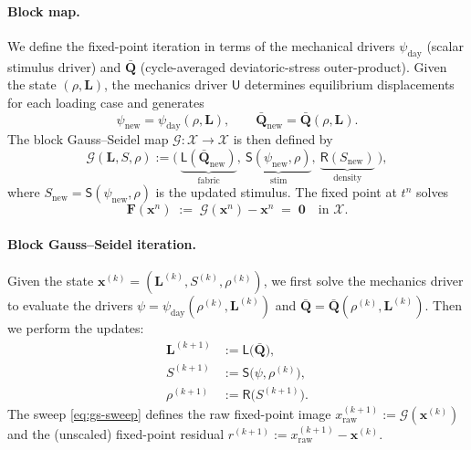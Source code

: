 \paragraph{Block map.}
We define the fixed-point iteration in terms of the mechanical drivers $\psi_{\mathrm{day}}$ (scalar stimulus driver) and $\bar{\mathbf{Q}}$ (cycle-averaged deviatoric-stress outer-product). Given the state $(\rho, \mathbf{L})$, the mechanics driver $\mathsf{U}$ determines equilibrium displacements for each loading case and generates
\[
\psi_{\mathrm{new}} = \psi_{\mathrm{day}}(\rho,\mathbf{L}), \qquad \bar{\mathbf{Q}}_{\mathrm{new}} = \bar{\mathbf{Q}}(\rho,\mathbf{L}).
\]
The block Gauss--Seidel map $\mathcal{G}:\mathcal{X}\to\mathcal{X}$ is then defined by
\begin{equation}\label{eq:block-map}
\mathcal{G}(\mathbf{L},S,\rho)
:=
\Big(\ \underbrace{\mathsf{L}(\bar{\mathbf{Q}}_{\mathrm{new}})}_{\text{fabric}},\ \underbrace{\mathsf{S}(\psi_{\mathrm{new}},\rho)}_{\text{stim}},\ \underbrace{\mathsf{R}(S_{\mathrm{new}})}_{\text{density}}\ \Big),
\end{equation}
where $S_{\mathrm{new}}=\mathsf{S}(\psi_{\mathrm{new}},\rho)$ is the updated stimulus. 
The fixed point at $t^n$ solves
\begin{equation}\label{eq:fp-residual}
\mathbf{F}(\mathbf{x}^n)\;:=\;\mathcal{G}(\mathbf{x}^n)-\mathbf{x}^n \;=\; \mathbf{0}\quad\text{in }\mathcal{X}.
\end{equation}

\paragraph{Block Gauss--Seidel iteration.}
Given the state $\mathbf{x}^{(k)}=(\mathbf{L}^{(k)},S^{(k)},\rho^{(k)})$, we first solve the mechanics driver to evaluate the drivers $\psi=\psi_{\mathrm{day}}(\rho^{(k)},\mathbf{L}^{(k)})$ and $\bar{\mathbf{Q}}=\bar{\mathbf{Q}}(\rho^{(k)},\mathbf{L}^{(k)})$. Then we perform the updates:
\begin{equation}\label{eq:gs-sweep}
\begin{aligned}
\mathbf{L}^{(k+1)} &:= \mathsf{L}\big(\bar{\mathbf{Q}}\big),\\
S^{(k+1)} &:= \mathsf{S}\big(\psi,\rho^{(k)}\big),\\
\rho^{(k+1)} &:= \mathsf{R}\big(S^{(k+1)}\big).
\end{aligned}
\end{equation}
The sweep \eqref{eq:gs-sweep} defines the raw fixed-point image $x_{\mathrm{raw}}^{(k+1)}:=\mathcal{G}(\mathbf{x}^{(k)})$ and the (unscaled) fixed-point residual $r^{(k+1)}:=x_{\mathrm{raw}}^{(k+1)}-\mathbf{x}^{(k)}$.

